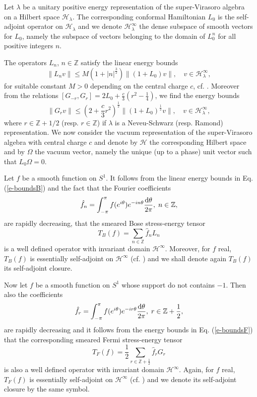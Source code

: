 \documentclass[11pt]{article}
\def\l{\lambda}
\def\H{{\cal H}}
\def\ZZ{{\mathbb Z}}
\def\H{{\mathcal H}}
\begin{document}
Let $\l$ be a unitary positive energy representation of the 
super-Virasoro algebra on a Hilbert space ${\mathcal H}_\l$. The 
corresponding conformal Hamiltonian $L_0$ is the self-adjoint operator on $\H_\l$ 
and we denote $\H_\l^\infty$ the dense subspace of smooth vectors for $L_0$, 
namely the subspace of vectors belonging to the domain of $L_0^n$ for all 
positive integers $n$.

The operators $L_n$,
$n\in {\mathbb Z}$ satisfy the linear energy bounds 
\begin{equation}
\label{e-boundsB}
\|L_n v\|\leq M (1+|n|^{\frac{3}{2}})\|(1+L_0)v\|, \quad v\in {\mathcal 
H}_\l^\infty, 
\end{equation}
for suitable constant $M>0$ depending on the central charge $c$, cf. 
\cite{BS-M,CW}. 
Moreover from the relations 
$[G_{-r}, G_r] = 2L_{0} + \frac{c}{3}(r^2 - \frac14)$, 
we find the energy bounds
\begin{equation}
\label{e-boundsF}
\|G_r v\|\leq (2+ \frac{c}{3}r^2)^{\frac12}\|(1+L_0)^{\frac12}v\|, \quad v\in 
{\mathcal H}_\l^\infty,
\end{equation}
where $r \in \ZZ+1/2$ (resp. $r \in \ZZ$) if $\l$ is a Neveu-Schwarz 
(resp. Ramond) representation. 
We now consider the vacuum representation of the super-Virasoro algebra with 
central charge $c$ and denote by $\H$ the corresponding Hilbert space and 
by $\Omega$ the vacuum vector, namely the unique (up to a phase) unit 
vector such that $L_0\Omega=0$.  

Let $f$ be a smooth function on $S^1$. It follows from the linear 
energy bounds in Eq. (\ref{e-boundsB}) and the fact that the Fourier 
coefficients
\begin{equation}
\hat{f}_n=\int_{-\pi}^\pi f(e^{i\theta})e^{-in\theta}\frac{{\rm d}\theta}{2\pi},\;
n\in \ZZ,
\end{equation}
are rapidly decreasing, that the smeared Bose stress-energy tensor  
\begin{equation}
T_B(f)= \sum_{n \in \ZZ}\hat{f}_nL_n
\end{equation}
is a well defined operator with invariant domain $\H^\infty$. Moreover, for 
$f$ real,  $T_B(f)$ is essentially self-adjoint on $\H^\infty$ (cf. \cite{BS-M})
and we shall denote again $T_B(f)$ its self-adjoint closure.  

Now let $f$ be a smooth function on $S^1$ whose support do not contains 
$-1$. Then also the coefficients  
\begin{equation}
\hat{f}_r=\int_{-\pi}^\pi f(e^{i\theta})e^{-ir\theta}\frac{{\rm d}\theta}{2\pi},\;
r\in \ZZ + \frac{1}{2},
\end{equation}
are rapidly decreasing and it follows from the energy bounds 
in Eq. (\ref{e-boundsF}) that the corresponding smeared Fermi stress-energy 
tensor 
\begin{equation}
T_F(f)=\frac{1}{2}\sum_{r \in \ZZ+\frac{1}{2}}\hat{f}_rG_r
\end{equation}
is also a well defined operator with invariant domain $\H^\infty$. Again, 
for $f$ real, $T_F(f)$ is essentially self-adjoint on $\H^\infty$ 
(cf. \cite{BS-M}) and we denote its self-adjoint closure by the same 
symbol. 
\end{document}
